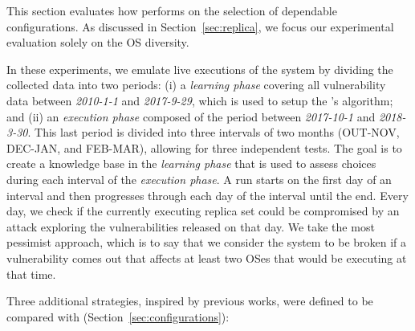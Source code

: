 This section evaluates how \system performs on the selection of dependable \replica configurations.
As discussed in Section~\ref{sec:replica}, we focus our experimental evaluation solely on the OS diversity.

In these experiments, we emulate live executions of the system by dividing the collected data into two periods:
(i) a \emph{learning phase} covering all vulnerability data between \emph{2010-1-1} and \emph{2017-9-29}, which is used to setup the \risk's algorithm; and (ii) an \emph{execution phase} composed of the period between \emph{2017-10-1} and \emph{2018-3-30}.
This last period is divided into three intervals of two months (OUT-NOV, DEC-JAN, and FEB-MAR), allowing for three independent tests.
The goal is to create a knowledge base in the \emph{learning phase} that is used to assess \system choices during each interval of the \emph{execution phase}. 
A run starts on the first day of an interval and then progresses through each day of the interval until the end. Every day, we check if the currently executing replica set could be compromised by an attack exploring the vulnerabilities released on that day. 
We take the most pessimist approach, which is to say that we consider the system to be broken if a vulnerability comes out that affects at least two OSes that would be executing at that time.

Three additional strategies, inspired by previous works, were defined to be compared with \system (Section~\ref{sec:configurations}):

